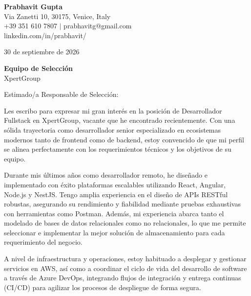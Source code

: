 \documentclass[11pt,a4paper]{article}
\begin{document}
\begin{flushleft}
    \textbf{Prabhavit Gupta} \\
    Via Zanetti 10, 30175, Venice, Italy \\
    +39 351 610 7807 $\vert$ prabhavitg@gmail.com \\
    linkedin.com/in/prabhavit/
\end{flushleft}

\vspace{5mm}
\begin{flushright}
    30 de septiembre de 2026
\end{flushright}

\vspace{5mm}
\begin{flushleft}
    \textbf{Equipo de Selección} \\
    XpertGroup \\
\end{flushleft}

\vspace{5mm}
\noindent Estimado/a Responsable de Selección:

\vspace{3mm}
\noindent Les escribo para expresar mi gran interés en la posición de Desarrollador Fullstack en XpertGroup, vacante que he encontrado recientemente. Con una sólida trayectoria como desarrollador senior especializado en ecosistemas modernos tanto de frontend como de backend, estoy convencido de que mi perfil se alinea perfectamente con los requerimientos técnicos y los objetivos de su equipo.

\vspace{3mm}
\noindent Durante mis últimos años como desarrollador remoto, he diseñado e implementado con éxito plataformas escalables utilizando React, Angular, Node.js y NestJS. Tengo amplia experiencia en el diseño de APIs RESTful robustas, asegurando su rendimiento y fiabilidad mediante pruebas exhaustivas con herramientas como Postman. Además, mi experiencia abarca tanto el modelado de bases de datos relacionales como no relacionales, lo que me permite seleccionar e implementar la mejor solución de almacenamiento para cada requerimiento del negocio.

\vspace{3mm}
\noindent A nivel de infraestructura y operaciones, estoy habituado a desplegar y gestionar servicios en AWS, así como a coordinar el ciclo de vida del desarrollo de software a través de Azure DevOps, integrando flujos de integración y entrega continuas (CI/CD) para agilizar los procesos de despliegue de forma segura.
\end{document}
